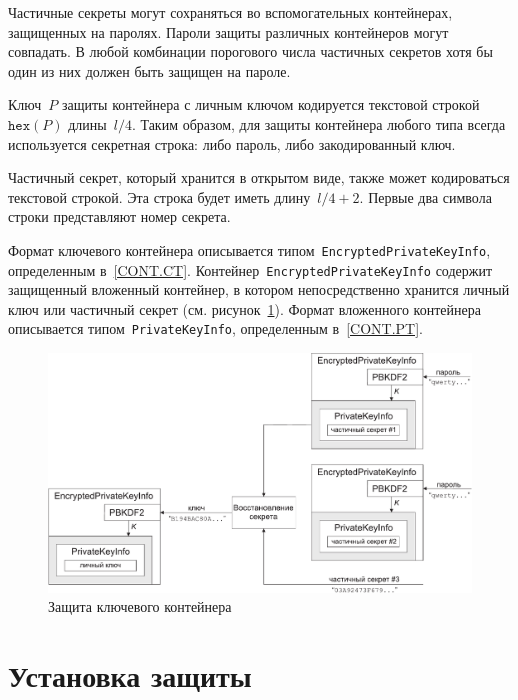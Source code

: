 Частичные секреты могут сохраняться во вспомогательных контейнерах, 
защищенных на паролях. Пароли защиты различных контейнеров могут совпадать.
В любой комбинации порогового числа частичных секретов хотя бы один из них 
должен быть защищен на пароле.

Ключ~$P$ защиты контейнера с личным ключом кодируется текстовой
строкой~$\texttt{hex}(P)$ длины~$l/4$.
%
Таким образом, для защиты контейнера любого типа всегда используется 
секретная строка: либо пароль, либо закодированный ключ.

Частичный секрет, который хранится в открытом виде, также может 
кодироваться текстовой строкой. Эта строка будет иметь длину~$l/4+2$.
Первые два символа строки представляют номер секрета.

Формат ключевого контейнера описывается 
типом~\texttt{EncryptedPrivateKeyInfo}, определенным в~\ref{CONT.CT}.
Контейнер~\texttt{EncryptedPrivateKeyInfo} содержит защищенный вложенный
контейнер, в котором непосредственно хранится личный ключ или частичный 
секрет (см. рисунок~\ref{Fig.CONT.1}). Формат вложенного контейнера 
описывается типом~\texttt{PrivateKeyInfo}, определенным в~\ref{CONT.PT}.

\begin{figure}[hbt]
\begin{center}
\includegraphics[width=15cm]{../figs/cont}
\end{center}
\caption{Защита ключевого контейнера}
\label{Fig.CONT.1}
\end{figure}

\section{Установка защиты}\label{CONT.Wrap}

